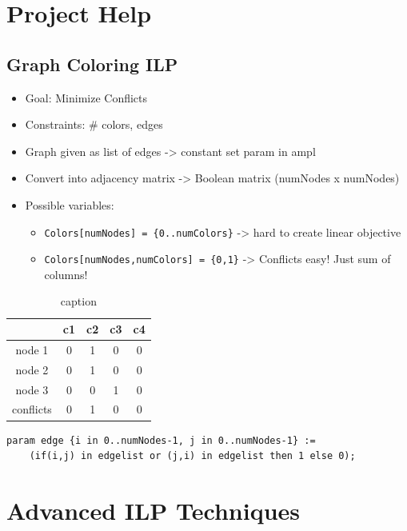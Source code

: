 \documentclass[12pt, letter]{article}
\begin{document}
\section{Project Help}%
\label{sec:project_help}

\subsection*{Graph Coloring ILP}
\begin{itemize}
	\item Goal: Minimize Conflicts
	\item Constraints: \# colors, edges
	\item Graph given as list of edges -> constant set param in ampl
	\item Convert into adjacency matrix -> Boolean matrix (numNodes x numNodes)
	\item Possible variables: 
    \begin{itemize}
        \item \texttt{Colors[numNodes] = \{0..numColors\}} -> hard to create linear objective
        \item \texttt{Colors[numNodes,numColors] = \{0,1\}} -> Conflicts easy! Just sum of columns!
    \end{itemize}
\end{itemize}

\begin{table}[h]
    \centering
    \caption{caption}
    \label{tab:label}
    \begin{tabular}{|c|c|c|c|c|}
    \hline
    & c1 & c2 & c3 & c4 \\
    \hline
    node 1 & 0 & 1 & 0 & 0 \\
    \hline
    node 2 & 0 & 1 & 0 & 0 \\
    \hline
    node 3 & 0 & 0 & 1 & 0 \\
    \hline
    conflicts & 0 & 1 & 0 & 0 \\
    \hline
    \end{tabular}
\end{table}

\begin{verbatim}
param edge {i in 0..numNodes-1, j in 0..numNodes-1} :=
    (if(i,j) in edgelist or (j,i) in edgelist then 1 else 0);
\end{verbatim}

\section{Advanced ILP Techniques}%
\label{sec:advanced_ilp_techniques}
\end{document}

